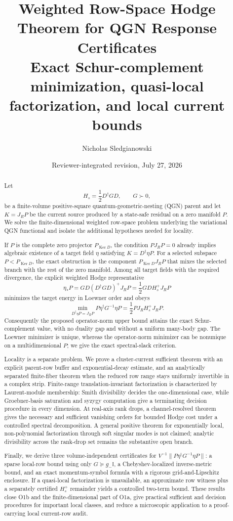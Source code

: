 \documentclass[11pt]{article}
\title{\textbf{Weighted Row-Space Hodge Theorem for QGN Response Certificates}\\[0.3em]
\large Exact Schur-complement minimization, quasi-local factorization, and local current bounds}
\author{Nicholas Sledgianowski}
\date{Reviewer-integrated revision, July 27, 2026}
\theoremstyle{definition}
\theoremstyle{remark}
\newcommand{\Ker}{\operatorname{Ker}}
\newcommand{\Id}{\mathbb I}
\begin{document}
\maketitle

\begin{abstract}
Let
\[
 H_s=\frac12D^\dagger GD,
 \qquad G\succ0,
\]
be a finite-volume positive-square quantum-geometric-nesting (QGN) parent and let $K=J_RP$ be the current source produced by a state-safe residual on a zero manifold $P$.  We solve the finite-dimensional weighted row-space problem underlying the variational QGN functional and isolate the additional hypotheses needed for locality.

If $P$ is the complete zero projector $P_{\Ker D}$, the condition $PJ_RP=0$ already implies algebraic existence of a target field $\eta$ satisfying $K=D^\dagger\eta P$.  For a selected subspace $P<P_{\Ker D}$, the exact obstruction is the component $P_{\Ker D}J_RP$ that mixes the selected branch with the rest of the zero manifold.  Among all target fields with the required divergence, the explicit weighted Hodge representative
\[
 \eta_*P
 =GD(D^\dagger GD)^+J_RP
 =\frac12GDH_s^+J_RP
\]
minimizes the target energy in Loewner order and obeys
\[
 \min_{D^\dagger\eta P=J_RP}
 P\eta^\dagger G^{-1}\eta P
 =\frac12PJ_RH_s^+J_RP.
\]
Consequently the proposed operator-norm upper bound attains the exact Schur-complement value, with no duality gap and without a uniform many-body gap.  The Loewner minimizer is unique, whereas the operator-norm minimizer can be nonunique on a multidimensional $P$; we give the exact spectral-slack criterion.

Locality is a separate problem.  We prove a cluster-current sufficient theorem with an explicit parent-row buffer and exponential-decay estimate, and an analytically separated finite-fiber theorem when the reduced row range stays uniformly invertible in a complex strip.  Finite-range translation-invariant factorization is characterized by Laurent-module membership: Smith divisibility decides the one-dimensional case, while Groebner-basis saturation and syzygy computation give a terminating decision procedure in every dimension.  At real-axis rank drops, a channel-resolved theorem gives the necessary and sufficient vanishing orders for bounded Hodge cost under a controlled spectral decomposition.  A general positive theorem for exponentially local, non-polynomial factorization through soft singular modes is not claimed; analytic divisibility across the rank-drop set remains the substantive open branch.

Finally, we derive three volume-independent certificates for
$V^{-1}\|P\eta^\dagger G^{-1}\eta P\|$: a sparse local-row bound using only $G\succeq g_-\Id$, a Chebyshev-localized inverse-metric bound, and an exact momentum-symbol formula with a rigorous grid-and-Lipschitz enclosure.  If a quasi-local factorization is unavailable, an approximate row witness plus a separately certified $H_s^+$ remainder yields a controlled two-term bound.  These results close O1b and the finite-dimensional part of O1a, give practical sufficient and decision procedures for important local classes, and reduce a microscopic application to a proof-carrying local current-row audit.
\end{abstract}
\end{document}
